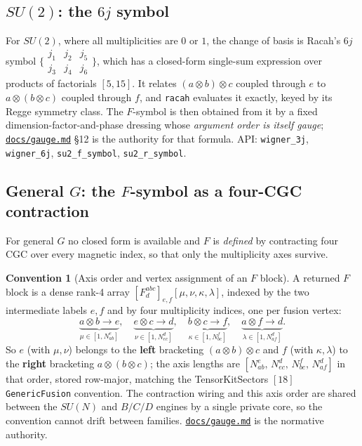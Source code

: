 \documentclass[11pt,a4paper]{article}
\theoremstyle{plain}
\theoremstyle{definition}
\newtheorem{convention}[theorem]{Convention}
\newcommand{\code}[1]{\texttt{#1}}
\newcommand{\gaugemd}{\href{https://github.com/Ryo-wtnb11/fusion-symbols/blob/main/docs/gauge.md}{\code{docs/gauge.md}}}
\begin{document}
\subsection{$SU(2)$: the $6j$ symbol}

For $SU(2)$, where all multiplicities are $0$ or $1$, the change of basis is
Racah's $6j$ symbol
$\bigl\{\begin{smallmatrix} j_1 & j_2 & j_5 \\ j_3 & j_4 & j_6\end{smallmatrix}\bigr\}$,
which has a closed-form single-sum expression over products of factorials
$[5,15]$. It relates $(a\otimes b)\otimes c$ coupled through $e$ to
$a\otimes(b\otimes c)$ coupled through $f$, and \code{racah} evaluates it
exactly, keyed by its Regge symmetry class. The $F$-symbol is then obtained
from it by a fixed dimension-factor-and-phase dressing whose \emph{argument
order is itself gauge}; \gaugemd{} \S12 is the authority for that formula.
API: \code{wigner\_3j}, \code{wigner\_6j}, \code{su2\_f\_symbol},
\code{su2\_r\_symbol}.

\subsection{General $G$: the $F$-symbol as a four-CGC contraction}
\label{sec:fsymbol}

For general $G$ no closed form is available and $F$ is \emph{defined} by
contracting four CGC over every magnetic index, so that only the multiplicity
axes survive.

\begin{convention}[Axis order and vertex assignment of an $F$ block]
\label{conv:faxes}
A returned $F$ block is a dense rank-4 array
$[F^{abc}_d]_{e,f}[\mu,\nu,\kappa,\lambda]$, indexed by the two intermediate
labels $e,f$ and by four multiplicity indices, one per fusion vertex:
\[
  \underbrace{a\otimes b\to e}_{\displaystyle \mu\in[1,N^e_{ab}]},\quad
  \underbrace{e\otimes c\to d}_{\displaystyle \nu\in[1,N^d_{ec}]},\quad
  \underbrace{b\otimes c\to f}_{\displaystyle \kappa\in[1,N^f_{bc}]},\quad
  \underbrace{a\otimes f\to d}_{\displaystyle \lambda\in[1,N^d_{af}]}.
\]
So $e$ (with $\mu,\nu$) belongs to the \textbf{left} bracketing
$(a\otimes b)\otimes c$ and $f$ (with $\kappa,\lambda$) to the \textbf{right}
bracketing $a\otimes(b\otimes c)$; the axis lengths are
$[N^e_{ab},\,N^d_{ec},\,N^f_{bc},\,N^d_{af}]$ in that order, stored row-major,
matching the TensorKitSectors $[18]$ \code{GenericFusion} convention. The
contraction wiring and this axis order are shared between the $SU(N)$ and
$B/C/D$ engines by a single private core, so the convention cannot drift
between families. \gaugemd{} is the normative authority.
\end{convention}
\end{document}
